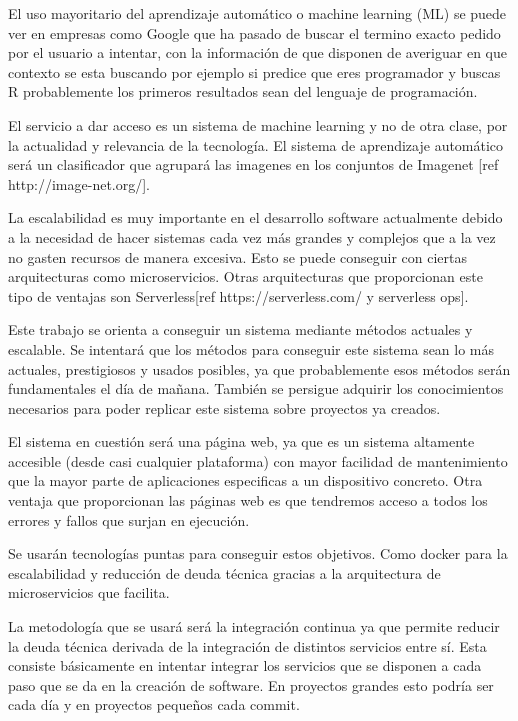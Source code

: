 

El uso mayoritario del aprendizaje automático o machine learning (ML) se puede ver en empresas como Google que ha pasado de buscar el termino exacto pedido por el usuario a intentar, con la información de que disponen de averiguar en que contexto se esta buscando por ejemplo si predice que eres programador y buscas R probablemente los primeros resultados sean del lenguaje de programación.

El servicio a dar acceso es un sistema de machine learning y no de otra clase, por la actualidad y relevancia de la tecnología. El sistema de aprendizaje automático será un clasificador que agrupará las imagenes en los conjuntos de Imagenet [ref http://image-net.org/].

La escalabilidad es muy importante en el desarrollo software actualmente debido a la necesidad de hacer sistemas cada vez más grandes y complejos que a la vez no gasten recursos de manera excesiva. Esto se puede conseguir con ciertas arquitecturas como microservicios. Otras arquitecturas que proporcionan este tipo de ventajas son Serverless[ref https://serverless.com/  y serverless ops].

Este trabajo se orienta a conseguir un sistema mediante métodos actuales y escalable. Se intentará que los métodos para conseguir este sistema sean lo más actuales, prestigiosos y usados posibles, ya que probablemente esos métodos serán fundamentales el día de mañana. También se persigue adquirir los conocimientos necesarios para poder replicar este sistema sobre proyectos ya creados.

El sistema en cuestión será una página web, ya que es un sistema altamente accesible (desde casi cualquier plataforma) con mayor facilidad de mantenimiento que la mayor parte de aplicaciones especificas a un dispositivo concreto. Otra ventaja que proporcionan las páginas web es que tendremos acceso a todos los errores y fallos que surjan en ejecución.

Se usarán tecnologías puntas para conseguir estos objetivos. Como docker para la escalabilidad y reducción de deuda técnica gracias a la arquitectura de microservicios que facilita.

La metodología que se usará será la integración continua ya que permite reducir la deuda técnica derivada de la integración de distintos servicios entre sí. Esta consiste básicamente en intentar integrar los servicios que se disponen a cada paso que se da en la creación de software. En proyectos grandes esto podría ser cada día y en proyectos pequeños cada commit.

